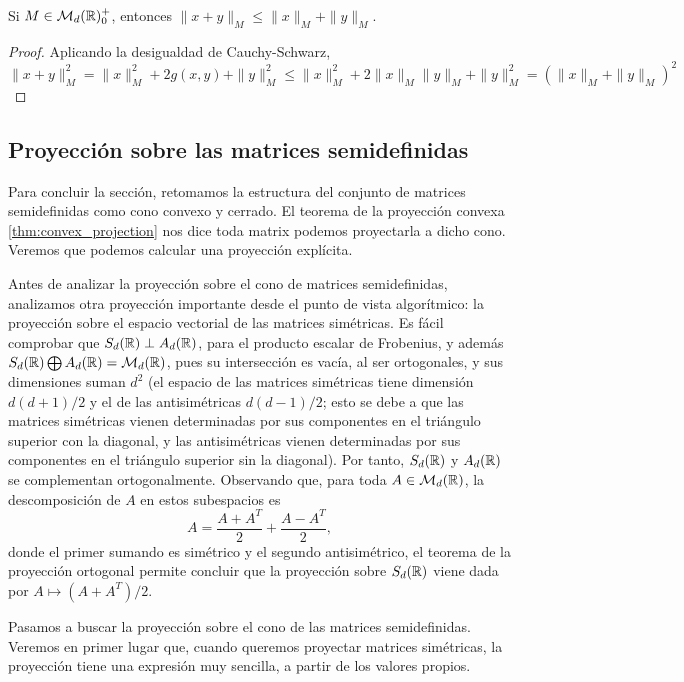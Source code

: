 \begin{cor}
    Si $M \in \mathcal{M}_d(\mathbb{R})^+_0$, entonces $\|x+y\|_M \le \|x\|_M + \|y\|_M$.
\end{cor}
\begin{proof}
    Aplicando la desigualdad de Cauchy-Schwarz,
    \[ \|x+y\|^2_M = \|x\|^2_M + 2g(x,y) + \|y\|_M^2 \le \|x\|^2_M + 2\|x\|_M\|y\|_M + \|y\|^2_M = (\|x\|_M + \|y\|_M)^2 \]
\end{proof}

\subsection{Proyección sobre las matrices semidefinidas}

Para concluir la sección, retomamos la estructura del conjunto de matrices semidefinidas como cono convexo y cerrado. El teorema de la proyección convexa \ref{thm:convex_projection} nos dice toda matrix podemos proyectarla a dicho cono. Veremos que podemos calcular una proyección explícita.

Antes de analizar la proyección sobre el cono de matrices semidefinidas, analizamos otra proyección importante desde el punto de vista algorítmico: la proyección sobre el espacio vectorial de las matrices simétricas. Es fácil comprobar que $S_d(\mathbb{R}) \perp A_d(\mathbb{R})$, para el producto escalar de Frobenius, y además $S_d(\mathbb{R}) \bigoplus A_d(\mathbb{R}) = \mathcal{M}_d(\mathbb{R})$, pues su intersección es vacía, al ser ortogonales, y sus dimensiones suman $d^2$ (el espacio de las matrices simétricas tiene dimensión $d(d+1)/2$ y el de las antisimétricas $d(d-1)/2$; esto se debe a que las matrices simétricas vienen determinadas por sus componentes en el triángulo superior con la diagonal, y las antisimétricas vienen determinadas por sus componentes en el triángulo superior sin la diagonal). Por tanto, $S_d(\mathbb{R})$ y $A_d(\mathbb{R})$ se complementan ortogonalmente. Observando que, para toda $A \in \mathcal{M}_d(\mathbb{R})$, la descomposición de $A$ en estos subespacios es
\[ A = \frac{A + A^T}{2} + \frac{A - A^T}{2}, \]
donde el primer sumando es simétrico y el segundo antisimétrico, el teorema de la proyección ortogonal permite concluir que la proyección sobre $S_d(\mathbb{R})$ viene dada por $A \mapsto (A + A^T)/2$.

Pasamos a buscar la proyección sobre el cono de las matrices semidefinidas. Veremos en primer lugar que, cuando queremos proyectar matrices simétricas, la proyección tiene una expresión muy sencilla, a partir de los valores propios.

